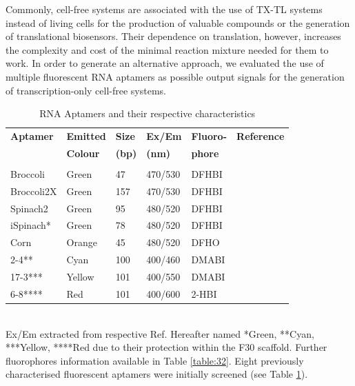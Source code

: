 Commonly, cell-free systems are associated with the use of TX-TL systems instead of living cells for the production of valuable compounds or the generation of translational biosensors. Their dependence on translation, however, increases the complexity and cost of the minimal reaction mixture needed for them to work. In order to generate an alternative approach, we evaluated the use of multiple fluorescent RNA aptamers as possible output signals for the generation of transcription-only cell-free systems.

\begin{table}[ht]

\caption{RNA Aptamers and their respective characteristics}
\label{table:3.1}%
{%
\begin{tabular*}{\columnwidth}{@{}llllll@{}}
\hline
\textbf{Aptamer} & \textbf{Emitted} & \textbf{Size} & \textbf{Ex/Em} & \textbf{Fluoro-} & \textbf{Reference}
\\
& \textbf{Colour} & \textbf{(bp)} & \textbf{(nm)} & \textbf{phore} & 
\\
\\
\hline
Broccoli & Green & 47 & 470/530 & DFHBI & \cite{filonov2014broccoli}
\\
Broccoli2X & Green & 157 & 470/530 & DFHBI & \cite{filonov2015gel}
\\
Spinach2 & Green & 95 & 480/520 & DFHBI & \cite{paige2011rna}
\\
iSpinach* & Green & 78 & 480/520 & DFHBI & \cite{autour2016ispinach}
\\
Corn & Orange & 45 & 480/520 & DFHO & \cite{song2017imaging}
\\
2-4** & Cyan & 100 & 400/460 & DMABI & \cite{paige2011rna}
\\
17-3*** & Yellow & 101 & 400/550 & DMABI & \cite{paige2011rna}
\\
6-8**** & Red & 101 & 400/600 & 2-HBI & \cite{paige2011rna}
\\
\hline
\hline
\end{tabular*}
}
\\
{Ex/Em extracted from respective Ref. Hereafter named *Green, **Cyan, ***Yellow, ****Red due to their protection within the F30 scaffold. Further fluorophores information available in Table \ref{table:32}. Eight previously characterised fluorescent aptamers were initially screened (see Table \ref{table:3.1}).}
\end{table}
